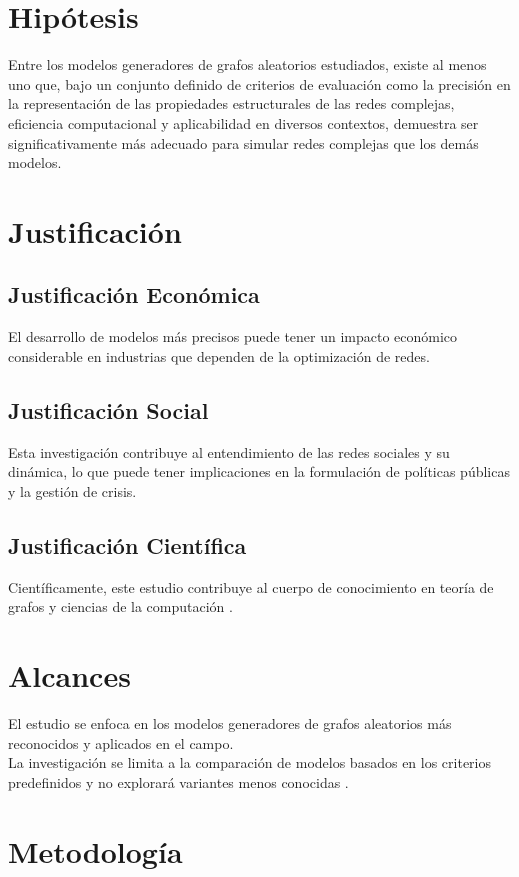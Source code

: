\section{Hipótesis}
Entre los modelos generadores de grafos aleatorios estudiados, existe al menos uno que, bajo un conjunto definido de criterios de evaluación como la precisión en la representación de las propiedades estructurales de las redes complejas, eficiencia computacional y aplicabilidad en diversos contextos, demuestra ser significativamente más adecuado para simular redes complejas que los demás modelos.

\section{Justificación}
\subsection{Justificación Económica}
El desarrollo de modelos más precisos puede tener un impacto económico considerable en industrias que dependen de la optimización de redes.
\subsection{Justificación Social}
Esta investigación contribuye al entendimiento de las redes sociales y su dinámica, lo que puede tener implicaciones en la formulación de políticas públicas y la gestión de crisis.
\subsection{Justificación Científica}
Científicamente, este estudio contribuye al cuerpo de conocimiento en teoría de grafos y ciencias de la computación .

\section{Alcances}
El estudio se enfoca en los modelos generadores de grafos aleatorios más reconocidos y aplicados en el campo.\\
La investigación se limita a la comparación de modelos basados en los criterios predefinidos y no explorará variantes menos conocidas .

\section{Metodología}

